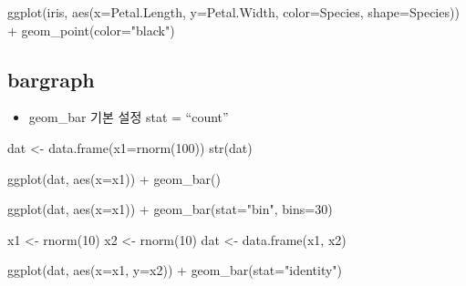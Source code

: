 \documentclass[
]{book}
\newenvironment{Shaded}{\begin{snugshade}}{\end{snugshade}}
\newcommand{\AttributeTok}[1]{\textcolor[rgb]{0.77,0.63,0.00}{#1}}
\newcommand{\DecValTok}[1]{\textcolor[rgb]{0.00,0.00,0.81}{#1}}
\newcommand{\FunctionTok}[1]{\textcolor[rgb]{0.00,0.00,0.00}{#1}}
\newcommand{\NormalTok}[1]{#1}
\newcommand{\OtherTok}[1]{\textcolor[rgb]{0.56,0.35,0.01}{#1}}
\newcommand{\SpecialCharTok}[1]{\textcolor[rgb]{0.00,0.00,0.00}{#1}}
\newcommand{\StringTok}[1]{\textcolor[rgb]{0.31,0.60,0.02}{#1}}
\providecommand{\tightlist}{%
  \setlength{\itemsep}{0pt}\setlength{\parskip}{0pt}}
\begin{document}
\begin{Shaded}
\begin{Highlighting}[]
\FunctionTok{ggplot}\NormalTok{(iris, }\FunctionTok{aes}\NormalTok{(}\AttributeTok{x=}\NormalTok{Petal.Length, }
                 \AttributeTok{y=}\NormalTok{Petal.Width, }
                 \AttributeTok{color=}\NormalTok{Species, }
                 \AttributeTok{shape=}\NormalTok{Species)) }\SpecialCharTok{+} 
  \FunctionTok{geom\_point}\NormalTok{(}\AttributeTok{color=}\StringTok{"black"}\NormalTok{)}
\end{Highlighting}
\end{Shaded}

\hypertarget{bargraph}{%
\subsection{bargraph}\label{bargraph}}

\begin{itemize}
\tightlist
\item
  geom\_bar 기본 설정 stat = ``count''
\end{itemize}

\begin{Shaded}
\begin{Highlighting}[]
\NormalTok{dat }\OtherTok{\textless{}{-}} \FunctionTok{data.frame}\NormalTok{(}\AttributeTok{x1=}\FunctionTok{rnorm}\NormalTok{(}\DecValTok{100}\NormalTok{))}
\FunctionTok{str}\NormalTok{(dat)}

\FunctionTok{ggplot}\NormalTok{(dat, }\FunctionTok{aes}\NormalTok{(}\AttributeTok{x=}\NormalTok{x1)) }\SpecialCharTok{+}
  \FunctionTok{geom\_bar}\NormalTok{()}

\FunctionTok{ggplot}\NormalTok{(dat, }\FunctionTok{aes}\NormalTok{(}\AttributeTok{x=}\NormalTok{x1)) }\SpecialCharTok{+}
  \FunctionTok{geom\_bar}\NormalTok{(}\AttributeTok{stat=}\StringTok{"bin"}\NormalTok{, }\AttributeTok{bins=}\DecValTok{30}\NormalTok{)}
\end{Highlighting}
\end{Shaded}

\begin{Shaded}
\begin{Highlighting}[]
\NormalTok{x1 }\OtherTok{\textless{}{-}} \FunctionTok{rnorm}\NormalTok{(}\DecValTok{10}\NormalTok{)}
\NormalTok{x2 }\OtherTok{\textless{}{-}} \FunctionTok{rnorm}\NormalTok{(}\DecValTok{10}\NormalTok{)}
\NormalTok{dat }\OtherTok{\textless{}{-}} \FunctionTok{data.frame}\NormalTok{(x1, x2)}

\FunctionTok{ggplot}\NormalTok{(dat, }\FunctionTok{aes}\NormalTok{(}\AttributeTok{x=}\NormalTok{x1, }\AttributeTok{y=}\NormalTok{x2)) }\SpecialCharTok{+}
  \FunctionTok{geom\_bar}\NormalTok{(}\AttributeTok{stat=}\StringTok{"identity"}\NormalTok{)}
\end{Highlighting}
\end{Shaded}
\end{document}
